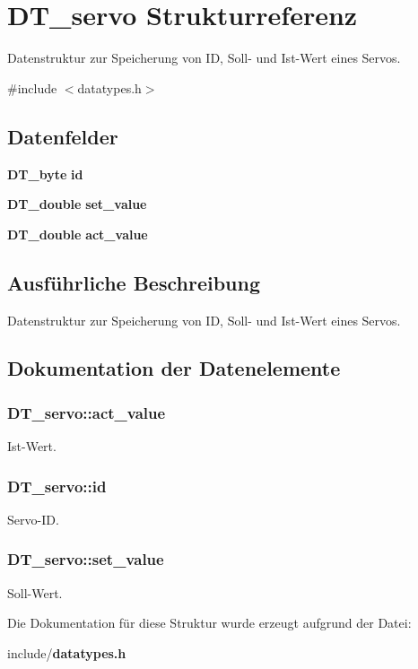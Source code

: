 \section{DT\_\-servo Strukturreferenz}
\label{struct_d_t__servo}


Datenstruktur zur Speicherung von ID, Soll-\/ und Ist-\/Wert eines Servos.  




{\ttfamily \#include $<$datatypes.h$>$}

\subsection*{Datenfelder}
\begin{DoxyCompactItemize}
\item 
{\bf DT\_\-byte} {\bf id}
\item 
{\bf DT\_\-double} {\bf set\_\-value}
\item 
{\bf DT\_\-double} {\bf act\_\-value}
\end{DoxyCompactItemize}


\subsection{Ausführliche Beschreibung}
Datenstruktur zur Speicherung von ID, Soll-\/ und Ist-\/Wert eines Servos. 

\subsection{Dokumentation der Datenelemente}
\subsubsection[{act\_\-value}]{ {\bf DT\_\-servo::act\_\-value}}\label{struct_d_t__servo_a655b9f9e4ca1e7d62211fe26e9df577b}
Ist-\/Wert. 
\subsubsection[{id}]{ {\bf DT\_\-servo::id}}\label{struct_d_t__servo_a7de110e453ab89b926df512b17f8612f}
Servo-\/ID. 
\subsubsection[{set\_\-value}]{ {\bf DT\_\-servo::set\_\-value}}\label{struct_d_t__servo_a682f3fee7b8b3c09fc70c3d19b9bb8a6}
Soll-\/Wert. 

Die Dokumentation für diese Struktur wurde erzeugt aufgrund der Datei:\begin{DoxyCompactItemize}
\item 
include/{\bf datatypes.h}\end{DoxyCompactItemize}
